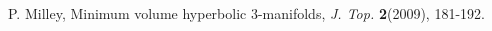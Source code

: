 \begin{thebibliography}{GHMTY}
 P. Milley, Minimum volume hyperbolic 3-manifolds, \textit {J. Top.} \textbf {2}(2009), 181-192.



% 


\end{thebibliography}

 
